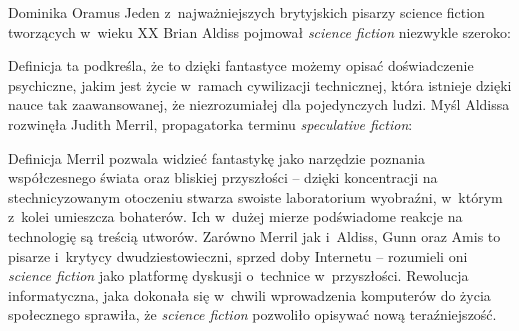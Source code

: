 \begin{artplenv}{Dominika Oramus}
Jeden z~najważniejszych brytyjskich pisarzy science fiction tworzących w~wieku XX Brian Aldiss pojmował \textit{science fiction} niezwykle szeroko:


Definicja ta podkreśla, że to dzięki fantastyce możemy opisać doświadczenie psychiczne, jakim jest życie w~ramach cywilizacji technicznej, która istnieje dzięki nauce tak zaawansowanej, że niezrozumiałej dla pojedynczych ludzi. Myśl Aldissa rozwinęła Judith Merril, propagatorka terminu \textit{speculative fiction}:


Definicja Merril pozwala widzieć fantastykę jako narzędzie poznania współczesnego świata oraz bliskiej przyszłości -- dzięki koncentracji na stechnicyzowanym otoczeniu stwarza swoiste laboratorium wyobraźni, w~którym z~kolei umieszcza bohaterów. Ich w~dużej mierze podświadome reakcje na technologię są treścią utworów. Zarówno Merril jak i~Aldiss, Gunn oraz Amis to pisarze i~krytycy dwudziestowieczni, sprzed doby Internetu -- rozumieli oni \textit{science fiction} jako platformę dyskusji o~technice w~przyszłości. Rewolucja informatyczna, jaka dokonała się w~chwili wprowadzenia komputerów do życia społecznego sprawiła, że \textit{science fiction} pozwoliło opisywać nową teraźniejszość.


\end{artplenv}
